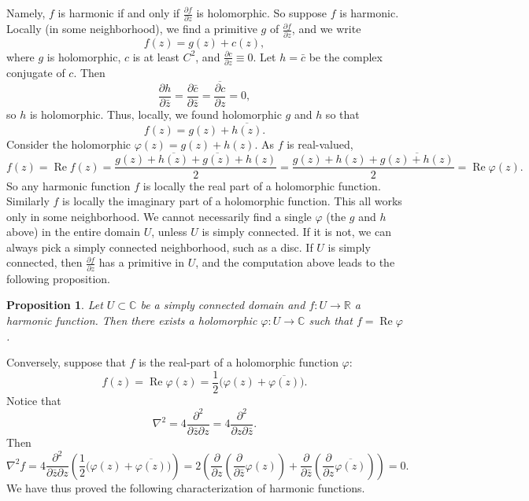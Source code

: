 \documentclass[12pt,openany]{book}
\renewcommand{\Re}{\operatorname{Re}}
\newcommand{\C}{{\mathbb{C}}}
\newcommand{\R}{{\mathbb{R}}}
\theoremstyle{plain}
\newtheorem{prop}[thm]{Proposition}
\theoremstyle{remark}
\theoremstyle{definition}
\theoremstyle{exercise}
\theoremstyle{example}
\begin{document}
Namely, $f$ is harmonic if and only if
$\frac{\partial f}{\partial z}$ is holomorphic.
So suppose $f$ is harmonic.
Locally (in some neighborhood), we find a
primitive $g$ of $\frac{\partial f}{\partial z}$, and we write
\begin{equation*}
f(z) = g(z) + c(z) ,
\end{equation*}
where $g$ is holomorphic, $c$ is at least $C^2$, and $\frac{\partial c}{\partial z} \equiv 0$.
Let $h = \bar{c}$ be the complex conjugate of $c$.  Then 
\begin{equation*}
\frac{\partial h}{\partial \bar{z}}
=
\frac{\partial \bar{c}}{\partial \bar{z}}
=
\overline{
\frac{\partial c}{\partial z}
}
=
0 ,
\end{equation*}
so $h$ is holomorphic.  Thus, locally, we found holomorphic $g$ and $h$ so
that
\begin{equation*}
f(z) = g(z) + \overline{h(z)} .
\end{equation*}
Consider the holomorphic $\varphi(z) = g(z) + h(z)$.
As $f$ is real-valued,
\begin{equation*}
f(z) = \Re f(z) =
\frac{g(z) + \overline{h(z)} + \overline{g(z)}+h(z)}{2}
=
\frac{g(z) + h(z) + \overline{g(z)+h(z)}}{2}
=
\Re \varphi(z) .
\end{equation*}
So any harmonic function $f$ is locally the real part of a holomorphic
function.  Similarly $f$ is locally the imaginary part of a holomorphic
function.
This all works only in some neighborhood.  We cannot necessarily find a single
$\varphi$ (the $g$ and $h$ above) in the entire
domain $U$, unless $U$ is simply connected.  If it is not, we can always
pick a simply connected neighborhood, such as a disc.
If $U$ is simply connected, then
$\frac{\partial f}{\partial z}$ has a primitive in $U$,
and the computation above leads to
the following proposition.

\begin{prop} \label{prop:harmconj}
Let $U \subset \C$ be a simply connected domain and $f \colon U \to \R$ a
harmonic function.  Then there exists a holomorphic $\varphi \colon
U \to \C$ such that $f = \Re \varphi$.
\end{prop}

Conversely,
suppose that $f$ is the real-part of a holomorphic function $\varphi$:
\begin{equation*}
f(z) = \Re \varphi(z) =
\frac{1}{2}\bigl( \varphi(z) + \overline{\varphi(z)} \bigr) .
\end{equation*}
Notice that
\begin{equation*}
\nabla^2 =
4 \frac{\partial^2}{\partial \bar{z} \partial z}
=
4 \frac{\partial^2}{\partial z \partial \bar{z}} .
\end{equation*}
Then
\begin{equation*}
\nabla^2 f =
4 \frac{\partial^2}{\partial \bar{z} \partial z}
\left(
\frac{1}{2}\bigl( \varphi(z) + \overline{\varphi(z)} \bigr)
\right)
=
2
\left(
\frac{\partial}{\partial z}
\left(
\frac{\partial}{\partial \bar{z}}
\varphi(z)
\right)+
\frac{\partial}{\partial \bar{z}}
\left(
\frac{\partial}{\partial z}
\overline{\varphi(z)}
\right)
\right)
=
0 .
\end{equation*}
We have thus proved the following characterization of harmonic
functions.
\end{document}
